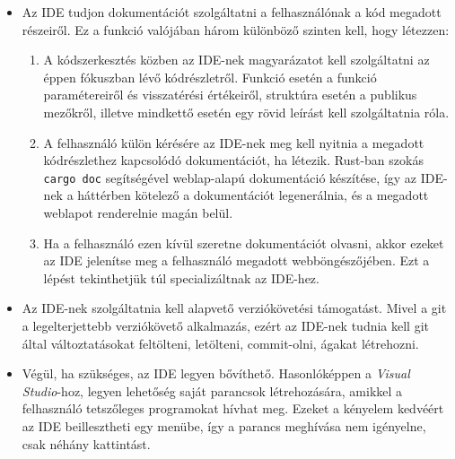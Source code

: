 \begin{itemize}
	\item Az IDE tudjon dokumentációt szolgáltatni a felhasználónak a kód megadott részeiről. Ez a funkció valójában három különböző szinten kell, hogy létezzen:
	\begin{enumerate}
		\item A kódszerkesztés közben az IDE-nek magyarázatot kell szolgáltatni az éppen fókuszban lévő kódrészletről. Funkció esetén a funkció paramétereiről és visszatérési értékeiről, struktúra esetén a publikus mezőkről, illetve mind\-ket\-tő esetén egy rövid leírást kell szolgáltatnia róla.
		
		\item A felhasználó külön kérésére az IDE-nek meg kell nyitnia a megadott kód\-rész\-let\-hez kapcsolódó dokumentációt, ha létezik. Rust-ban szokás \texttt{cargo doc} segítségével weblap-alapú dokumentáció készítése, így az IDE-nek a háttérben kötelező a dokumentációt legenerálnia, és a megadott weblapot renderelnie magán belül.
		
		\item Ha a felhasználó ezen kívül szeretne dokumentációt olvasni, akkor ezeket az IDE jelenítse meg a felhasználó megadott webböngészőjében. Ezt a lépést tekinthetjük túl specializáltnak az IDE-hez.
	\end{enumerate}
	
	\item Az IDE-nek szolgáltatnia kell alapvető verziókövetési támogatást. Mivel a git a legelterjettebb verziókövető alkalmazás, ezért az IDE-nek tudnia kell git által változtatásokat feltölteni, letölteni, commit-olni, ágakat létrehozni.
	
	\item Végül, ha szükséges, az IDE legyen bővíthető. Hasonlóképpen a \emph{Visual Studio}-hoz, legyen lehetőség saját parancsok létrehozására, amikkel a felhasználó tet\-sző\-le\-ges programokat hívhat meg. Ezeket a kényelem kedvéért az IDE beillesztheti egy menübe, így a parancs meghívása nem igényelne, csak néhány kattintást.
\end{itemize}
